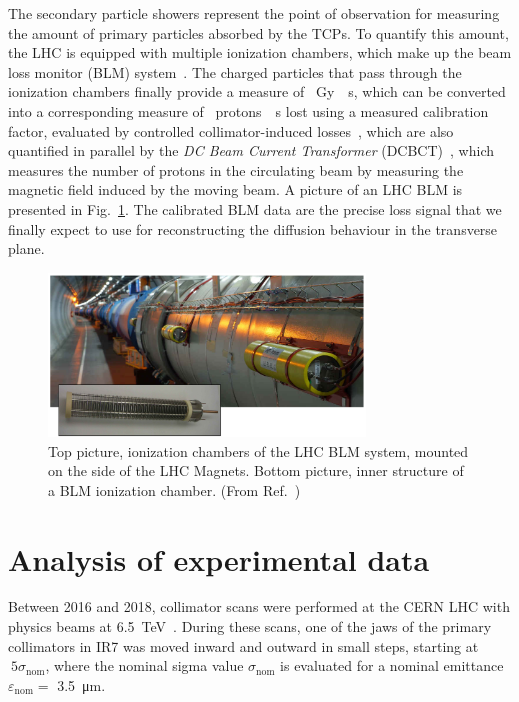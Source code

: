 The secondary particle showers represent the point of observation for measuring the amount of primary particles absorbed by the TCPs. To quantify this amount, the LHC is equipped with multiple ionization chambers, which make up the beam loss monitor (BLM) system~\cite{blmSystem1, blmSystem2}. The charged particles that pass through the ionization chambers finally provide a measure of \SI{}{Gy \per s}, which can be converted into a corresponding measure of \SI{}{protons \per s} lost using a measured calibration factor, evaluated by controlled collimator-induced losses~\cite{arek}, which are also quantified in parallel by the \textit{DC Beam Current Transformer} (DCBCT)~\cite{Denard:1213275}, which measures the number of protons in the circulating beam by measuring the magnetic field induced by the moving beam. A picture of an LHC BLM is presented in Fig.~\ref{fig:blm}. The calibrated BLM data are the precise loss signal that we finally expect to use for reconstructing the diffusion behaviour in the transverse plane.

\begin{figure}[hpt]
    \centering
    \includegraphics[width=0.75\textwidth]{5_Diffusion_measurement_LHC/figs/blm.png}
    \caption{Top picture, ionization chambers of the LHC BLM system, mounted on the side of the LHC Magnets. Bottom picture, inner structure of a BLM ionization chamber. (From Ref.~\cite{blmonline})}
    \label{fig:blm}
\end{figure}
%
\section{Analysis of experimental data}
%
Between 2016 and 2018, collimator scans were performed at the CERN LHC with physics beams at \SI{6.5}{TeV}~\cite{PhysRevAccelBeams.23.044802}. During these scans, one of the jaws of the primary collimators in IR7 was moved inward and outward in small steps, starting at $~5\sigma_\text{nom}$, where the nominal sigma value $\sigma_\text{nom}$ is evaluated for a nominal emittance $\varepsilon_\text{nom} =$ \SI{3.5}{\micro\meter}.


